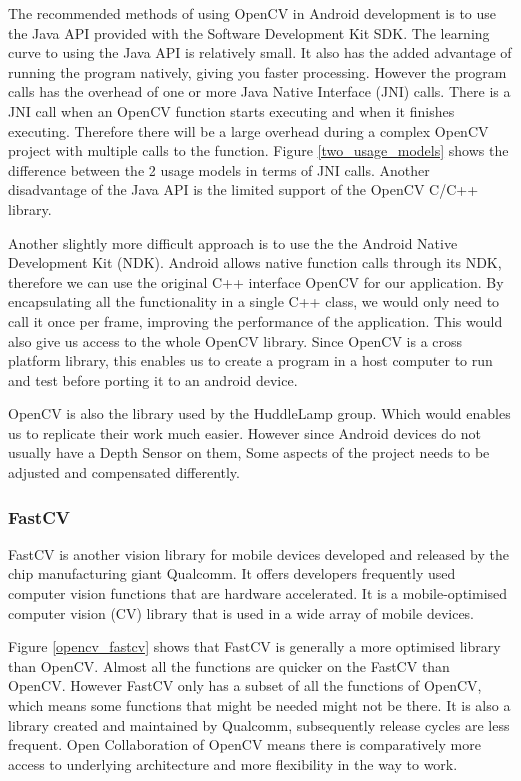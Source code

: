 The recommended methods of using OpenCV in Android development is to use the Java API provided with the Software Development Kit SDK\cite{opencv_usage_model}. The learning curve to using the Java API is relatively small. It also has the added advantage of running the program natively, giving you faster processing. However the program calls has the overhead of  one or more Java Native Interface (JNI) calls. There is a JNI call when an OpenCV function starts executing and when it finishes executing. Therefore there will be a large overhead during a complex OpenCV project with multiple calls to the function. Figure \ref{two_usage_models} shows the difference between the 2 usage models in terms of JNI calls. Another disadvantage of the Java API is the limited support of the OpenCV C/C++ library. 

Another slightly more difficult approach is to use the the Android Native Development Kit (NDK). Android allows native function calls through its NDK, therefore we can use the original C++ interface OpenCV for our application. By encapsulating all the functionality in a single C++ class, we would only need to call it once per frame, improving the performance of the application. This would also give us access to the whole OpenCV library. Since OpenCV is a cross platform library, this enables us to create a program in a host computer to run and test before porting it to an android device.

OpenCV is also the library used by the HuddleLamp group. Which would enables us to replicate their work much easier. However since Android devices do not usually have a Depth Sensor on them, Some aspects of the project needs to be adjusted and compensated differently.

\subsubsection{FastCV}
FastCV is another vision library for mobile devices developed and released by the chip manufacturing giant Qualcomm\cite{fastcv}. It offers developers frequently used computer vision functions that are hardware accelerated. It is a mobile-optimised computer vision (CV) library that is used in a wide array of mobile devices.

Figure \ref{opencv_fastcv} shows that FastCV is generally a more optimised library than OpenCV. Almost all the functions are quicker on the FastCV than OpenCV. However FastCV only has a subset of all the functions of OpenCV, which means some functions that might be needed might not be there. It is also a library created and maintained by Qualcomm, subsequently release cycles are less frequent. Open Collaboration of OpenCV means there is comparatively more access to underlying architecture and more flexibility in the way to work. 


